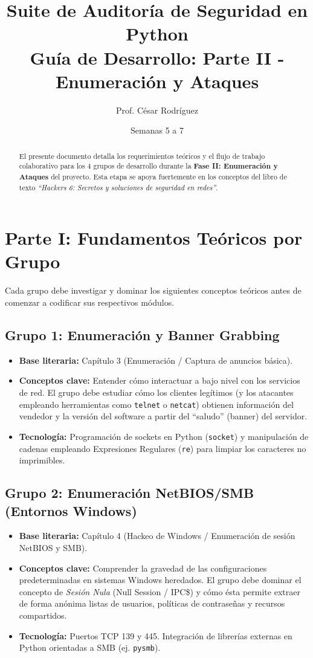 \documentclass[12pt,letterpaper]{article}
\title{\textbf{Suite de Auditoría de Seguridad en Python}\\ \Large Guía de Desarrollo: Parte II - Enumeración y Ataques}
\author{Prof. César Rodríguez}
\date{Semanas 5 a 7}
\begin{document}
\maketitle

\begin{abstract}
El presente documento detalla los requerimientos teóricos y el flujo de trabajo colaborativo para los 4 grupos de desarrollo durante la \textbf{Fase II: Enumeración y Ataques} del proyecto. Esta etapa se apoya fuertemente en los conceptos del libro de texto \textit{``Hackers 6: Secretos y soluciones de seguridad en redes''}.
\end{abstract}

\section{Parte I: Fundamentos Teóricos por Grupo}
Cada grupo debe investigar y dominar los siguientes conceptos teóricos antes de comenzar a codificar sus respectivos módulos.

\subsection*{Grupo 1: Enumeración y Banner Grabbing}
\begin{itemize}
    \item \textbf{Base literaria:} Capítulo 3 (Enumeración / Captura de anuncios básica).
    \item \textbf{Conceptos clave:} Entender cómo interactuar a bajo nivel con los servicios de red. El grupo debe estudiar cómo los clientes legítimos (y los atacantes empleando herramientas como \texttt{telnet} o \texttt{netcat}) obtienen información del vendedor y la versión del software a partir del ``saludo'' (banner) del servidor.
    \item \textbf{Tecnología:} Programación de sockets en Python (\texttt{socket}) y manipulación de cadenas empleando Expresiones Regulares (\texttt{re}) para limpiar los caracteres no imprimibles.
\end{itemize}

\subsection*{Grupo 2: Enumeración NetBIOS/SMB (Entornos Windows)}
\begin{itemize}
    \item \textbf{Base literaria:} Capítulo 4 (Hackeo de Windows / Enumeración de sesión NetBIOS y SMB).
    \item \textbf{Conceptos clave:} Comprender la gravedad de las configuraciones predeterminadas en sistemas Windows heredados. El grupo debe dominar el concepto de \textit{Sesión Nula} (Null Session / IPC\$) y cómo ésta permite extraer de forma anónima listas de usuarios, políticas de contraseñas y recursos compartidos.
    \item \textbf{Tecnología:} Puertos TCP 139 y 445. Integración de librerías externas en Python orientadas a SMB (ej. \texttt{pysmb}).
\end{itemize}
\end{document}
